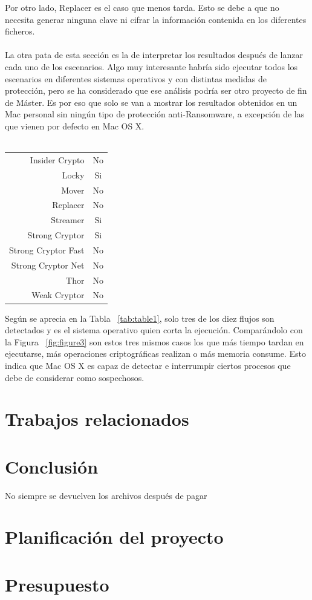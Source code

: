 \documentclass[a4paper,12pt]{article}
\begin{document}
Por otro lado, Replacer es el caso que menos tarda. Esto se debe a que no necesita generar ninguna clave ni cifrar la información contenida en los diferentes ficheros.\\\\
La otra pata de esta sección es la de interpretar los resultados después de lanzar cada uno de los escenarios. Algo muy interesante habría sido ejecutar todos los escenarios en diferentes sistemas operativos y con distintas medidas de protección, pero se ha considerado que ese análisis podría ser otro proyecto de fin de Máster. Es por eso que solo se van a mostrar los resultados obtenidos en un Mac personal sin ningún tipo de protección anti-Ransomware, a excepción de las que vienen por defecto en Mac OS X.\\\\
\begin{center}
	\begin{tabular}{ r | c }
		Insider Crypto & No \\ 
		Locky  & Si \\ 
		Mover  & No \\ 
		Replacer  & No \\ 
		Streamer  & Si \\ 
		Strong Cryptor  & Si \\ 
		Strong Cryptor Fast  & No \\ 
		Strong Cryptor Net  & No \\ 
		Thor  & No \\ 
		Weak Cryptor & No \\
	\end{tabular}
	\label{tab:table1}
\end{center}
Según se aprecia en la Tabla ~\ref{tab:table1}, solo tres de los diez flujos son detectados y es el sistema operativo quien corta la ejecución. Comparándolo con la Figura ~\ref{fig:figure3} son estos tres mismos casos los que más tiempo tardan en ejecutarse, más operaciones criptográficas realizan o más memoria consume. Esto indica que Mac OS X es capaz de detectar e interrumpir ciertos procesos que debe de considerar como sospechosos.
\newpage
\section{Trabajos relacionados}
\newpage
\section{Conclusión}
No siempre se devuelven los archivos después de pagar
\appendix
\section{Planificación del proyecto}
\section{Presupuesto}
\end{document}
